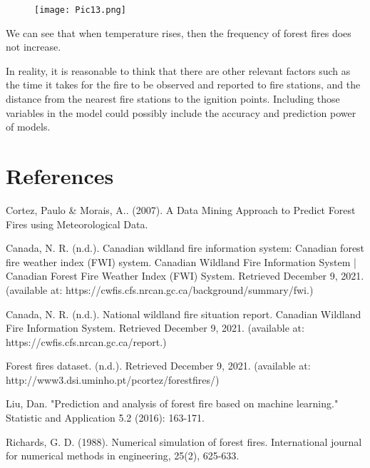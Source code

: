 \documentclass[12pt]{article}
\renewcommand\appendix{\setcounter{secnumdepth}{-2}}
\theoremstyle{plain}
\begin{document}
\begin{spacing}{1}
\begin{flushleft}
 \begin{figure}[htp]
 	\centering  
 	\texttt{[image: Pic13.png]}
 	\label{fig:figure1label}
 \end{figure}


\vspace{2.0mm}

 We can see that when temperature rises, then the frequency of forest fires does not increase. 
 
 
 \vspace{2.0mm}
 
 In reality, it is reasonable to think that there are other relevant factors such as the time it takes for the fire to be observed and reported to fire stations, and the distance from the nearest fire stations to the ignition points. Including those variables in the model could possibly include the accuracy and prediction power of models.
 
 
 \vspace{2.0mm}
 
 
  \newpage
 \appendix
\section{References}
\begin{thebibliography}{90}
	 Cortez, Paulo \& Morais, A.. (2007). A Data Mining Approach to Predict Forest Fires using Meteorological Data. 
	
	
	 Canada, N. R. (n.d.). Canadian wildland fire information system: Canadian forest fire weather index (FWI) system. Canadian Wildland Fire Information System | Canadian Forest Fire Weather Index (FWI) System. Retrieved December 9, 2021.  {(available at:   https://cwfis.cfs.nrcan.gc.ca/background/summary/fwi.)}
	
	 Canada, N. R. (n.d.). National wildland fire situation report. Canadian Wildland Fire Information System. Retrieved December 9, 2021. {(available at: https://cwfis.cfs.nrcan.gc.ca/report.)}
	
	 Forest fires dataset. (n.d.). Retrieved December 9, 2021. {(available at: http://www3.dsi.uminho.pt/pcortez/forestfires/)}
	
	Liu, Dan. "Prediction and analysis of forest fire based on machine learning." Statistic and Application 5.2 (2016): 163-171.
	
	Richards, G. D. (1988). Numerical simulation of forest fires. International journal for numerical methods in engineering, 25(2), 625-633.
	
\end{thebibliography}
 
 
   
 

\end{flushleft}
\end{spacing}


 
 
 

 \newpage
\end{document}
